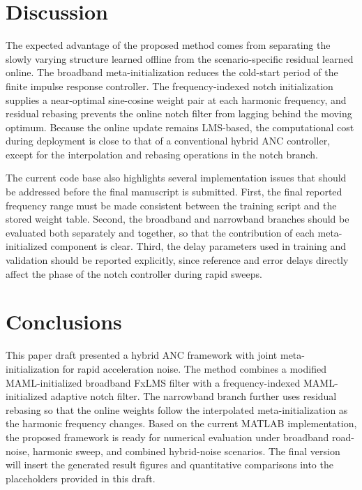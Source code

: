 \documentclass{internoise2026}
\begin{document}
\section{Discussion}

The expected advantage of the proposed method comes from separating the slowly varying structure learned offline from the scenario-specific residual learned online. The broadband meta-initialization reduces the cold-start period of the finite impulse response controller. The frequency-indexed notch initialization supplies a near-optimal sine-cosine weight pair at each harmonic frequency, and residual rebasing prevents the online notch filter from lagging behind the moving optimum. Because the online update remains LMS-based, the computational cost during deployment is close to that of a conventional hybrid ANC controller, except for the interpolation and rebasing operations in the notch branch.

The current code base also highlights several implementation issues that should be addressed before the final manuscript is submitted. First, the final reported frequency range must be made consistent between the training script and the stored weight table. Second, the broadband and narrowband branches should be evaluated both separately and together, so that the contribution of each meta-initialized component is clear. Third, the delay parameters used in training and validation should be reported explicitly, since reference and error delays directly affect the phase of the notch controller during rapid sweeps.

\section{Conclusions}

This paper draft presented a hybrid ANC framework with joint meta-initialization for rapid acceleration noise. The method combines a modified MAML-initialized broadband FxLMS filter with a frequency-indexed MAML-initialized adaptive notch filter. The narrowband branch further uses residual rebasing so that the online weights follow the interpolated meta-initialization as the harmonic frequency changes. Based on the current MATLAB implementation, the proposed framework is ready for numerical evaluation under broadband road-noise, harmonic sweep, and combined hybrid-noise scenarios. The final version will insert the generated result figures and quantitative comparisons into the placeholders provided in this draft.
\end{document}
